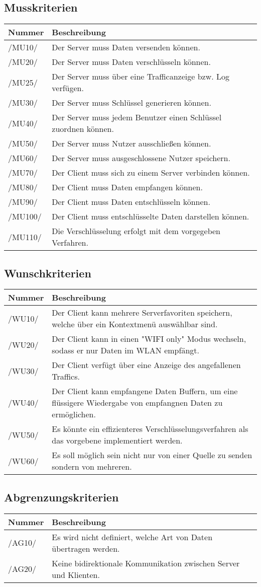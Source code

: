 \documentclass[a4paper,10pt]{article}
\newcommand\addrow[2]{#1 &#2\\ }
\newcommand\addheading[2]{#1 &#2\\ \hline}
\newcommand\tabularhead{\begin{tabular}{lp{13cm}}
\hline
}
\newenvironment{usecase}{\tabularhead}
{\hline\end{tabular}}
\begin{document}
\subsection{Musskriterien}
\newcommand{\mussKuerzel}{MU}
\begin{usecase}
\addheading{Nummer}{Beschreibung}
\addrow{/\mussKuerzel10/} {Der Server muss Daten versenden können.}
\addrow{/\mussKuerzel20/} {Der Server muss Daten verschlüsseln können.}
\addrow{/\mussKuerzel25/} {Der Server muss über eine Trafficanzeige bzw. Log verfügen.}
\addrow{/\mussKuerzel30/} {Der Server muss Schlüssel generieren können.}
\addrow{/\mussKuerzel40/} {Der Server muss jedem Benutzer einen Schlüssel zuordnen können.}
\addrow{/\mussKuerzel50/} {Der Server muss Nutzer ausschließen können.}
\addrow{/\mussKuerzel60/} {Der Server muss ausgeschlossene Nutzer speichern.}
\addrow{/\mussKuerzel70/} {Der Client muss sich zu einem Server verbinden können.}
\addrow{/\mussKuerzel80/} {Der Client muss Daten empfangen können.}
\addrow{/\mussKuerzel90/} {Der Client muss Daten entschlüsseln können.}
\addrow{/\mussKuerzel100/} {Der Client muss entschlüsselte Daten darstellen können.}
\addrow{/\mussKuerzel110/} {Die Verschlüsselung erfolgt mit dem vorgegeben Verfahren.}
\end{usecase}

\subsection{Wunschkriterien}
\newcommand{\wunschKuerzel}{WU}
\begin{usecase}
\addheading{Nummer}{Beschreibung}
\addrow{/\wunschKuerzel10/} {Der Client kann mehrere Serverfavoriten speichern, welche über ein Kontextmenü auswählbar sind.}
\addrow{/\wunschKuerzel20/} {Der Client kann in einen "WIFI only" Modus wechseln, sodass er nur Daten im WLAN empfängt.}
\addrow{/\wunschKuerzel30/} {Der Client verfügt über eine Anzeige des angefallenen Traffics.}
\addrow{/\wunschKuerzel40/} {Der Client kann empfangene Daten Buffern, um eine flüssigere Wiedergabe von empfangnen Daten zu ermöglichen.}
\addrow{/\wunschKuerzel50/} {Es könnte ein effizienteres Verschlüsselungsverfahren als das vorgebene implementiert werden.}
\addrow{/\wunschKuerzel60/} {Es soll möglich sein nicht nur von einer Quelle zu senden sondern von mehreren.}
\end{usecase}

\subsection{Abgrenzungskriterien}
\newcommand{\abgrenzungKuerzel}{AG}
\begin{usecase}
\addheading{Nummer}{Beschreibung}
\addrow{/\abgrenzungKuerzel10/} {Es wird nicht definiert, welche Art von Daten übertragen werden.}
\addrow{/\abgrenzungKuerzel20/} {Keine bidirektionale Kommunikation zwischen Server und Klienten.}
\end{usecase}
\end{document}
